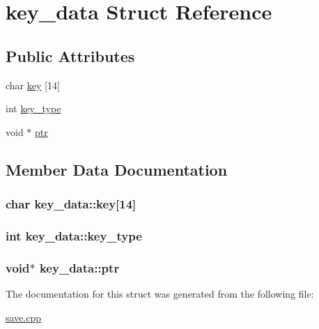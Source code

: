 \hypertarget{structkey__data}{\section{key\-\_\-data Struct Reference}
\label{structkey__data}
}
\subsection*{Public Attributes}
\begin{DoxyCompactItemize}
\item 
char \hyperlink{structkey__data_a85a3a42fc62d9e21534cac2d4915d1de}{key} \mbox{[}14\mbox{]}
\item 
int \hyperlink{structkey__data_ad6f069760d712a5cbdd76db56941dfc8}{key\-\_\-type}
\item 
void $\ast$ \hyperlink{structkey__data_a4a9c8d47812fb7e7d77ac7a51cf5994e}{ptr}
\end{DoxyCompactItemize}


\subsection{Member Data Documentation}
\hypertarget{structkey__data_a85a3a42fc62d9e21534cac2d4915d1de}{
\subsubsection[{key}]{\setlength{\rightskip}{0pt plus 5cm}char key\-\_\-data\-::key\mbox{[}14\mbox{]}}}\label{structkey__data_a85a3a42fc62d9e21534cac2d4915d1de}
\hypertarget{structkey__data_ad6f069760d712a5cbdd76db56941dfc8}{
\subsubsection[{key\-\_\-type}]{\setlength{\rightskip}{0pt plus 5cm}int key\-\_\-data\-::key\-\_\-type}}\label{structkey__data_ad6f069760d712a5cbdd76db56941dfc8}
\hypertarget{structkey__data_a4a9c8d47812fb7e7d77ac7a51cf5994e}{
\subsubsection[{ptr}]{\setlength{\rightskip}{0pt plus 5cm}void$\ast$ key\-\_\-data\-::ptr}}\label{structkey__data_a4a9c8d47812fb7e7d77ac7a51cf5994e}


The documentation for this struct was generated from the following file\-:\begin{DoxyCompactItemize}
\item 
\hyperlink{save_8cpp}{save.\-cpp}\end{DoxyCompactItemize}

